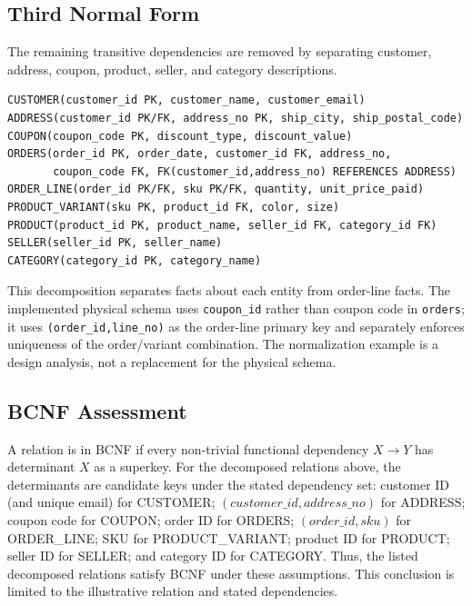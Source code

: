 \documentclass[11pt,a4paper,oneside]{report}
\begin{document}
\subsection{Third Normal Form}
The remaining transitive dependencies are removed by separating customer, address, coupon, product, seller, and category descriptions.
\begin{lstlisting}[caption={Illustrative third normal form decomposition}]
CUSTOMER(customer_id PK, customer_name, customer_email)
ADDRESS(customer_id PK/FK, address_no PK, ship_city, ship_postal_code)
COUPON(coupon_code PK, discount_type, discount_value)
ORDERS(order_id PK, order_date, customer_id FK, address_no,
       coupon_code FK, FK(customer_id,address_no) REFERENCES ADDRESS)
ORDER_LINE(order_id PK/FK, sku PK/FK, quantity, unit_price_paid)
PRODUCT_VARIANT(sku PK, product_id FK, color, size)
PRODUCT(product_id PK, product_name, seller_id FK, category_id FK)
SELLER(seller_id PK, seller_name)
CATEGORY(category_id PK, category_name)
\end{lstlisting}
This decomposition separates facts about each entity from order-line facts. The implemented physical schema uses \texttt{coupon\_id} rather than coupon code in \texttt{orders}; it uses \texttt{(order\_id,line\_no)} as the order-line primary key and separately enforces uniqueness of the order/variant combination. The normalization example is a design analysis, not a replacement for the physical schema.

\subsection{BCNF Assessment}
A relation is in BCNF if every non-trivial functional dependency $X\rightarrow Y$ has determinant $X$ as a superkey. For the decomposed relations above, the determinants are candidate keys under the stated dependency set: customer ID (and unique email) for CUSTOMER; $(customer\_id,address\_no)$ for ADDRESS; coupon code for COUPON; order ID for ORDERS; $(order\_id,sku)$ for ORDER\_LINE; SKU for PRODUCT\_VARIANT; product ID for PRODUCT; seller ID for SELLER; and category ID for CATEGORY. Thus, the listed decomposed relations satisfy BCNF under these assumptions. This conclusion is limited to the illustrative relation and stated dependencies.
\end{document}
